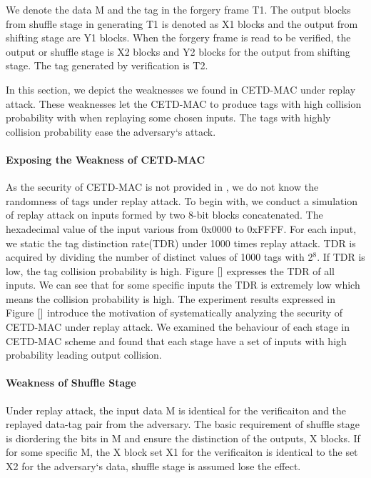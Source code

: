 \documentclass{article}
\begin{document}
We denote the data M and the tag in the forgery frame T1. The output blocks from shuffle stage in generating T1 is denoted as X1 blocks and the output from shifting stage are Y1 blocks. When the forgery frame is read to be verified, the output or shuffle stage is X2 blocks and Y2 blocks for the output from shifting stage. The tag generated by verification is T2.  

In this section, we depict the weaknesses we found in CETD-MAC under replay attack. These weaknesses let the CETD-MAC to produce tags with high collision probability with when replaying some chosen inputs. The tags with highly collision probability ease the adversary`s attack. 

\paragraph{Exposing the Weakness of CETD-MAC}
As the security of CETD-MAC is not provided in \cite{}, we do not know the randomness of tags under replay attack. To begin with, we conduct a simulation of replay attack on inputs formed by two 8-bit blocks concatenated. The hexadecimal value of the input various from 0x0000 to 0xFFFF. For each input, we static the tag distinction rate(TDR) under 1000 times replay attack. TDR is acquired by dividing the number of distinct values of 1000 tags with 2$^8$. If TDR is low, the tag collision probability is high. Figure $\ref{}$ expresses the TDR of all inputs. We can see that for some specific inputs the TDR is extremely low which means the collision probability is high. The experiment results expressed in Figure $\ref{}$ introduce the motivation of systematically analyzing the security of CETD-MAC under replay attack. We examined the behaviour of each stage in CETD-MAC scheme and found that each stage have a set of inputs with high probability leading output collision.

\paragraph{Weakness of Shuffle Stage}
Under replay attack, the input data M is identical for the verificaiton and
the replayed data-tag pair from the adversary. The basic requirement of shuffle
stage is diordering the bits in M and ensure the distinction of the outputs, X
blocks. If for some specific M, the X block set X1 for the verificaiton is
identical to the set X2 for the adversary`s data, shuffle stage is assumed lose
the effect.
\end{document}

